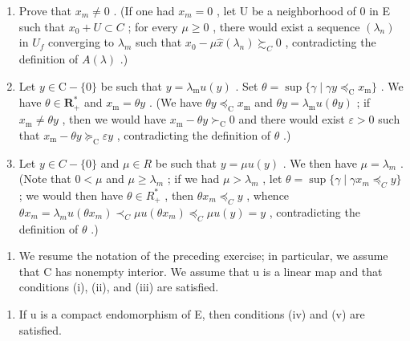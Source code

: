 \begin{enumerate}
\def\labelenumi{\alph{enumi})}
\setcounter{enumi}{3}
\item
  Prove that \(x_{m} \neq 0\) . (If one had \(x_{m} = 0\) , let U be a neighborhood of 0 in E such that \(x_{0} + U \subset C\) ; for every \(\mu \geqslant 0\) , there would exist a sequence \((\lambda_{n})\) in \(U_{f}\) converging to \(\lambda_{m}\) such that \(x_{0} - \mu \hat{x}(\lambda_{n}) \succsim_{C} 0\) , contradicting the definition of \(A(\lambda)\) .)
\item
  Let \(y \in \mathrm{C} - \{0\}\) be such that \(y = \lambda_{\mathrm{m}} u(y)\) . Set \(\theta = \sup \{\gamma \mid \gamma y \preccurlyeq_{\mathrm{C}} x_{\mathrm{m}}\}\) . We have \(\theta \in \mathbf{R}_{+}^{*}\) and \(x_{\mathrm{m}} = \theta y\) . (We have \(\theta y \preccurlyeq_{\mathrm{C}} x_{\mathrm{m}}\) and \(\theta y = \lambda_{\mathrm{m}} u(\theta y)\) ; if \(x_{\mathrm{m}} \neq \theta y\) , then we would have \(x_{\mathrm{m}} - \theta y \succ_{\mathrm{C}} 0\) and there would exist \(\varepsilon > 0\) such that \(x_{\mathrm{m}} - \theta y \succcurlyeq_{\mathrm{C}} \varepsilon y\) , contradicting the definition of \(\theta\) .)
\item
  Let \(y \in C - \{0\}\) and \(\mu \in R\) be such that \(y = \mu u(y)\) . We then have \(\mu = \lambda_{m}\) . (Note that \(0 < \mu\) and \(\mu \geqslant \lambda_{m}\) ; if we had \(\mu > \lambda_{m}\) , let \(\theta = \sup\{\gamma \mid \gamma x_{m} \preccurlyeq_{C} y\}\) ; we would then have \(\theta \in R_{+}^{*}\) , then \(\theta x_{m} \preccurlyeq_{C} y\) , whence \(\theta x_{m} = \lambda_{m} u(\theta x_{m}) \prec_{C} \mu u(\theta x_{m}) \preccurlyeq_{C} \mu u(y) = y\) , contradicting the definition of \(\theta\) .)
\end{enumerate}

\begin{enumerate}
\def\labelenumi{\arabic{enumi})}
\setcounter{enumi}{28}
\tightlist
\item
  We resume the notation of the preceding exercise; in particular, we assume that C has nonempty interior. We assume that u is a linear map and that conditions (i), (ii), and (iii) are satisfied.
\end{enumerate}

\begin{enumerate}
\def\labelenumi{\alph{enumi})}
\tightlist
\item
  If u is a compact endomorphism of E, then conditions (iv) and (v) are satisfied.
\end{enumerate}

